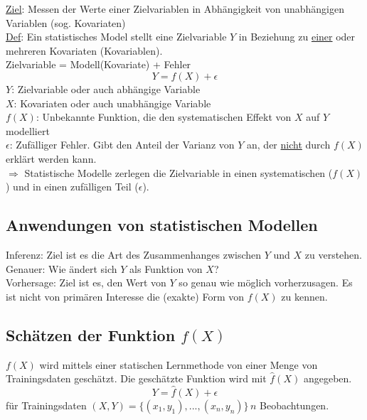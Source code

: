 \documentclass[10pt]{report}
\theoremstyle{definition}
\begin{document}
\underline{Ziel}: Messen der Werte einer Zielvariablen in Abhängigkeit von unabhängigen Variablen (sog. Kovariaten) \\
\underline{Def}: Ein statistisches Model stellt eine Zielvariable $Y$ in Beziehung zu \underline{einer} oder mehreren Kovariaten (Kovariablen). \\
Zielvariable = Modell(Kovariate) + Fehler \\
\[ Y = f(X) + \epsilon \]
$Y$: Zielvariable oder auch abhängige Variable \\
$X$: Kovariaten oder auch unabhängige Variable \\
$f(X)$: Unbekannte Funktion, die den systematischen Effekt von $X$ auf $Y$ modelliert \\
$\epsilon$: Zufälliger Fehler. Gibt den Anteil der Varianz von $Y$ an, der \underline{nicht} durch $f(X)$ erklärt werden kann. \\
$\Rightarrow$ Statistische Modelle zerlegen die Zielvariable in einen systematischen ($f(X)$) und in einen zufälligen Teil ($\epsilon$). \\

\subsection{Anwendungen von statistischen Modellen}
Inferenz: Ziel ist es die Art des Zusammenhanges zwischen $Y$ und $X$ zu verstehen. Genauer: Wie ändert sich $Y$ als Funktion von $X$?\\
Vorhersage: Ziel ist es, den Wert von $Y$ so genau wie möglich vorherzusagen. Es ist nicht von primären Interesse die (exakte) Form von $f(X)$ zu kennen. \\

\subsection{Schätzen der Funktion $f(X)$}
$f(X)$ wird mittels einer statischen Lernmethode von einer Menge von Trainingsdaten geschätzt. Die geschätzte Funktion wird mit $\hat{f}(X)$ angegeben.
\[ Y = \hat{f}(X) + \epsilon \]
für Trainingsdaten $(X,Y) = \{(x_1,y_1),...,(x_n,y_n)\}\, n$ Beobachtungen.
\end{document}
